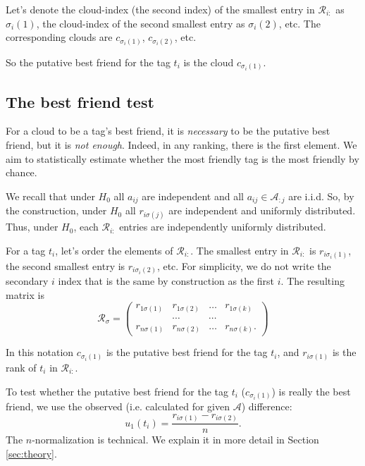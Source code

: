 \documentclass{llncs}
\begin{document}
Let's denote the cloud-index (the second index) of the smallest entry in $\mathcal{R}_{i:}$ as $\sigma_i(1)$, the cloud-index of the second smallest entry as ${\sigma_i(2)}$, etc. The corresponding clouds are $c_{\sigma_{i}(1)}$, $c_{\sigma_{i}(2)}$, etc. 

So the putative best friend for the tag $t_i$ is the cloud $c_{\sigma_{i}(1)}$.

\subsection{The best friend test}
\label{sec:best_friend_test}

For a cloud to be a tag's best friend, it is \textit{necessary} to be the putative best friend, but it is \textit{not enough}. Indeed, in any ranking, there is the first element. We aim to statistically estimate whether the most friendly tag is the most friendly by chance. 

We recall that under $H_0$ all $a_{ij}$ are independent and all $a_{ij} \in \mathcal{A}_{:j}$ are i.i.d. So, by the construction, under $H_0$ all $r_{i\sigma(j)}$ are independent and uniformly distributed.
Thus, under $H_0$, each $\mathcal{R}_{i:}$ entries are independently uniformly distributed. 

For a tag $t_i$, let's order the elements of $\mathcal{R}_{i:}$. The smallest entry in $\mathcal{R}_{i:}$ is $r_{i\sigma_i(1)}$, the second smallest entry is $r_{i\sigma_i(2)}$, etc. For simplicity, we do not write the secondary $i$ index that is the same by construction as the first $i$. The resulting matrix is 
\begin{equation}
\label{def:R_sigma}
\mathcal{R}_{\sigma} = \begin{pmatrix}
r_{1\sigma(1)} & r_{1\sigma(2)} & \dots & r_{1\sigma(k)} \\
       &\cdots & \cdots &  \\
r_{n\sigma(1)} & r_{n\sigma(2)} & \dots & r_{n\sigma(k)}.
\end{pmatrix}
\end{equation}

In this notation $c_{\sigma_i(1)}$ is the putative best friend for the tag $t_i$, and $r_{i\sigma(1)}$ is the rank of $t_i$ in $\mathcal{R}_{i:}$. 

To test whether the putative best friend for the tag $t_i$ ($c_{\sigma_i(1)}$) is really the best friend, we use the observed (i.e. calculated for given $\mathcal{A}$) difference:
\begin{equation}
\label{def:u_1}
u_1(t_i) = \frac{r_{i\sigma(1)} -  r_{i\sigma(2)}}{n}.
\end{equation}
The $n$-normalization is technical. We explain it in more detail in Section \ref{sec:theory}.
\end{document}
